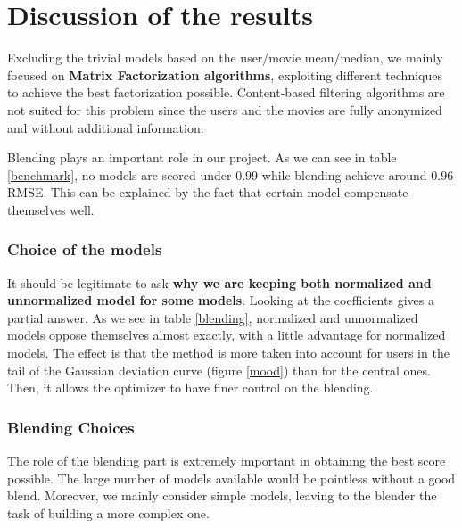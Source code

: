 \documentclass[10pt,conference,compsocconf]{IEEEtran}
\begin{document}
\section{Discussion of the results}

Excluding the trivial models based on the user/movie mean/median, we mainly focused on \textbf{Matrix
Factorization algorithms}, exploiting different techniques to achieve the best factorization
possible. Content-based filtering algorithms are not suited for this problem since the users and the
movies are fully anonymized and without additional information.

Blending plays an important role in our project. As we can see in table \ref{benchmark}, no models are scored under $0.99$ while blending achieve around $0.96$ RMSE. This can be explained by the fact that certain model compensate themselves well.


\subsubsection{Choice of the models}

It should be legitimate to ask \textbf{why we are keeping both normalized and unnormalized model for
some models}. Looking at the coefficients gives a partial answer. As we see in table \ref{blending}, normalized and unnormalized models oppose themselves almost exactly, with a little advantage for normalized models. The effect is that the method is more taken into account for users in the tail of the Gaussian deviation curve (figure \ref{mood}) than for the central ones. Then, it allows the optimizer to have finer control on the blending.

\subsubsection{Blending Choices}
The role of the blending part is extremely important in obtaining the best score possible. The large
number of models available would be pointless without a good blend. Moreover, we mainly consider
simple models, leaving to the blender the task of building a more complex one.
\end{document}
